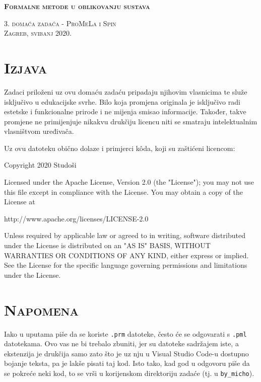 \documentclass{article}
\newcommand{\crnotice}[1]
{
    \begin{center}
        \colorbox{red!15}{\parbox{\textwidth}{#1}}
    \end{center}
}
\newcommand{\sekcija}[1]{\section{\textsc{#1}}}
\newcommand{\code}[1]{\colorbox{blue!11}{\texttt{#1}}}
\begin{document}
\begin{titlepage}
    \centering
    \vspace*{\fill}

    \huge
    \textbf{\textsc{Formalne metode u oblikovanju sustava}} \\
    
    \vspace*{0.5cm}
    
    \large
    \textsc{3. domaća zadaća - ProMeLa i Spin} \\

    \vspace*{\fill}
    \textsc{Zagreb, svibanj 2020.}
\end{titlepage}

\tableofcontents
\pagebreak



\sekcija{Izjava}

Zadaci priloženi uz ovu domaću zadaću pripadaju njihovim vlasnicima te služe isključivo u edukacijske svrhe. Bilo koja promjena originala je isključivo radi estetske i funkcionalne prirode i ne mijenja smisao informacije. Također, takve promjene ne primijenjuje nikakvu drukčiju licencu niti se smatraju intelektualnim vlasništvom uređivača.
\newline

Uz ovu datoteku obično dolaze i primjerci kôda, koji su zaštićeni licencom:

\crnotice
{
    Copyright 2020 Studoši
    \newline

    Licensed under the Apache License, Version 2.0 (the "License");
    you may not use this file except in compliance with the License.
    You may obtain a copy of the License at
    \newline

        \quad
        http://www.apache.org/licenses/LICENSE-2.0
        \newline

    Unless required by applicable law or agreed to in writing, software
    distributed under the License is distributed on an "AS IS" BASIS,
    WITHOUT WARRANTIES OR CONDITIONS OF ANY KIND, either express or implied.
    See the License for the specific language governing permissions and
    limitations under the License.
}

\sekcija{Napomena}

Iako u uputama piše da se koriste \texttt{.prm} datoteke, često će se odgovarati s \texttt{.pml} datotekama. Ovo vas ne bi trebalo zbuniti, jer su datoteke sadržajem iste, a ekstenzija je drukčija samo zato što je uz nju u Visual Studio Code-u dostupno bojanje teksta, pa je lakše pisati taj kod. Isto tako, kad god u odgovoru piše da se pokreće neki kod, to se vrši u korijenskom direktoriju zadaće (tj. u \code{by\_micho}).
\end{document}
